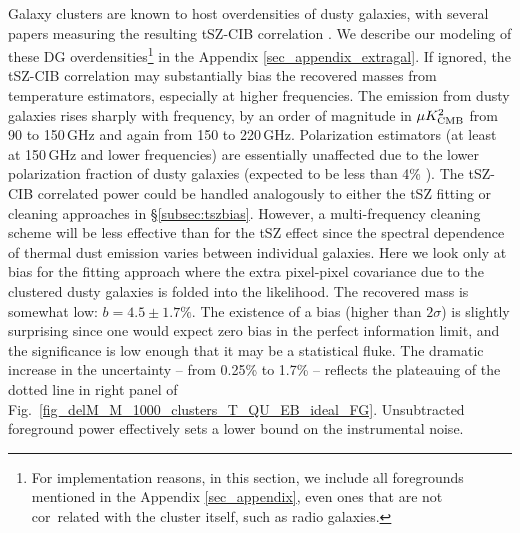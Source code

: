 Galaxy clusters are known to host overdensities of dusty galaxies, with several papers measuring the resulting tSZ-CIB correlation \citep{actdunkley2013, george2015, PLANCKTSZCIB2016}.
We describe our modeling of these DG overdensities\footnote{For implementation reasons, in this section, we include all foregrounds mentioned in the Appendix \ref{sec_appendix}, even ones that are not cor\
related with the cluster itself, such as radio galaxies.} in the Appendix \ref{sec_appendix_extragal}.
If ignored, the tSZ-CIB correlation may substantially bias the recovered masses from temperature estimators, especially at higher frequencies.
The emission from dusty galaxies rises sharply with frequency, by an order of magnitude in $\mu K^2_{\rm CMB}$ from 90 to 150\,GHz and again from 150 to 220\,GHz.
Polarization estimators (at least at 150\,GHz and lower frequencies) are essentially unaffected due to the lower polarization fraction  of dusty galaxies (expected to be less than 4\% \citep{seiffert2007,sptpol_delensing_2017}).
The tSZ-CIB correlated power could be handled analogously to either the tSZ fitting or cleaning approaches in \S\ref{subsec:tszbias}.
However, a multi-frequency cleaning scheme will be less effective than for the tSZ effect since the spectral dependence of thermal dust emission varies between individual galaxies.
Here we look only at bias for the fitting approach where the extra pixel-pixel covariance due to the clustered dusty galaxies is folded into the likelihood.
The recovered mass is somewhat low: $b=4.5 \pm 1.7\%$.
The existence of a bias (higher than $2\sigma$) is slightly surprising since one would expect zero bias in the perfect information limit, and the significance is low enough that it may be a statistical fluke.
The dramatic increase in the uncertainty -- from 0.25\% to 1.7\% -- reflects the plateauing of the dotted line in right panel of Fig.~\ref{fig_delM_M_1000_clusters_T_QU_EB_ideal_FG}.
Unsubtracted foreground power effectively sets a lower bound on the instrumental noise.


 